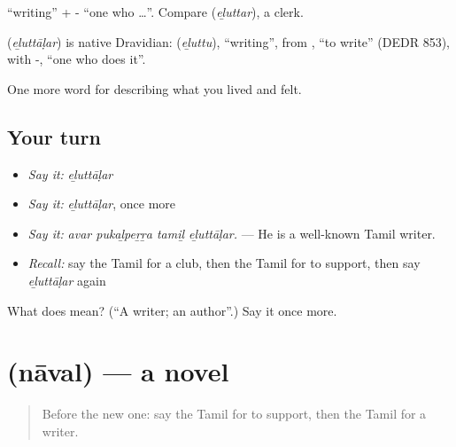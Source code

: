  \textquotedblleft{}writing\textquotedblright{} + - \textquotedblleft{}one who …\textquotedblright{}. Compare  (\emph{eḻuttar}), a clerk.

\begin{cousinweb}
\textbf{} (\emph{eḻuttāḷar}) is native Dravidian:  (\emph{eḻuttu}), \textquotedblleft{}writing\textquotedblright{}, from , \textquotedblleft{}to write\textquotedblright{} (DEDR 853), with -, \textquotedblleft{}one who does it\textquotedblright{}.
\end{cousinweb}

\begin{grammarlens}[title={What you've built}]
One more word for describing what you lived and felt.
\end{grammarlens}

\subsection*{Your turn}
\begin{itemize}
\raggedright
  \item \emph{Say it:} \emph{eḻuttāḷar}
  \item \emph{Say it:} \emph{eḻuttāḷar}, once more
  \item \emph{Say it:} \emph{avar pukaḻpeṟṟa tamiḻ eḻuttāḷar.} — He is a well-known Tamil writer.
  \item \emph{Recall:} say the Tamil for a club, then the Tamil for to support, then say \emph{eḻuttāḷar} again
\end{itemize}

\begin{tcolorbox}[breakable,colback=teal!4,colframe=teal!35!black,title={Before you move on}]
What does  mean? (\textquotedblleft{}A writer; an author\textquotedblright{}.) Say it once more.
\end{tcolorbox}
\section[\texorpdfstring{\ta{நாவல்} (nāval)}{நாவல் (nāval)}]{ (nāval) — a novel}

\label{lesson:TA-C528-naval}



\begin{quote}
Before the new one: say the Tamil for to support, then the Tamil for a writer.
\end{quote}


